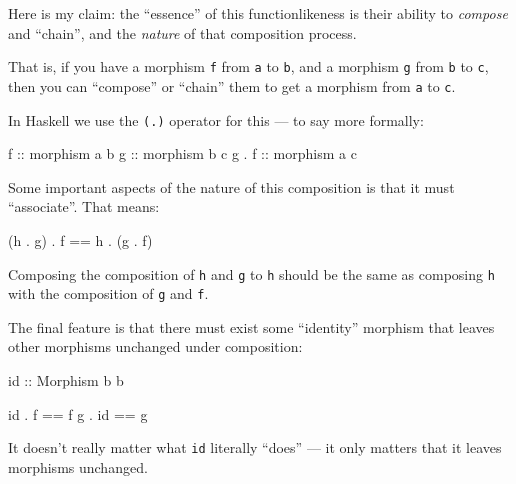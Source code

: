 \documentclass[]{article}
\newenvironment{Shaded}{}{}
\newcommand{\DataTypeTok}[1]{\textcolor[rgb]{0.56,0.13,0.00}{{#1}}}
\newcommand{\OtherTok}[1]{\textcolor[rgb]{0.00,0.44,0.13}{{#1}}}
\newcommand{\FunctionTok}[1]{\textcolor[rgb]{0.02,0.16,0.49}{{#1}}}
\newcommand{\NormalTok}[1]{{#1}}
\begin{document}
Here is my claim: the ``essence'' of this functionlikeness is their
ability to \emph{compose} and ``chain'', and the \emph{nature} of that
composition process.

That is, if you have a morphism \texttt{f} from \texttt{a} to
\texttt{b}, and a morphism \texttt{g} from \texttt{b} to \texttt{c},
then you can ``compose'' or ``chain'' them to get a morphism from
\texttt{a} to \texttt{c}.

In Haskell we use the \texttt{(.)} operator for this --- to say more
formally:

\begin{Shaded}
\begin{Highlighting}[]
\OtherTok{f     ::} \NormalTok{morphism a b}
\OtherTok{g     ::} \NormalTok{morphism b c}
\NormalTok{g }\FunctionTok{.}\OtherTok{ f ::} \NormalTok{morphism a c}
\end{Highlighting}
\end{Shaded}

Some important aspects of the nature of this composition is that it must
``associate''. That means:

\begin{Shaded}
\begin{Highlighting}[]
\NormalTok{(h }\FunctionTok{.} \NormalTok{g) }\FunctionTok{.} \NormalTok{f }\FunctionTok{==} \NormalTok{h }\FunctionTok{.} \NormalTok{(g }\FunctionTok{.} \NormalTok{f)}
\end{Highlighting}
\end{Shaded}

Composing the composition of \texttt{h} and \texttt{g} to \texttt{h}
should be the same as composing \texttt{h} with the composition of
\texttt{g} and \texttt{f}.

The final feature is that there must exist some ``identity'' morphism
that leaves other morphisms unchanged under composition:

\begin{Shaded}
\begin{Highlighting}[]
\NormalTok{id}\OtherTok{ ::} \DataTypeTok{Morphism} \NormalTok{b b}

\NormalTok{id }\FunctionTok{.} \NormalTok{f  }\FunctionTok{==} \NormalTok{f}
\NormalTok{g  }\FunctionTok{.} \NormalTok{id }\FunctionTok{==} \NormalTok{g}
\end{Highlighting}
\end{Shaded}

It doesn't really matter what \texttt{id} literally ``does'' --- it only
matters that it leaves morphisms unchanged.
\end{document}
